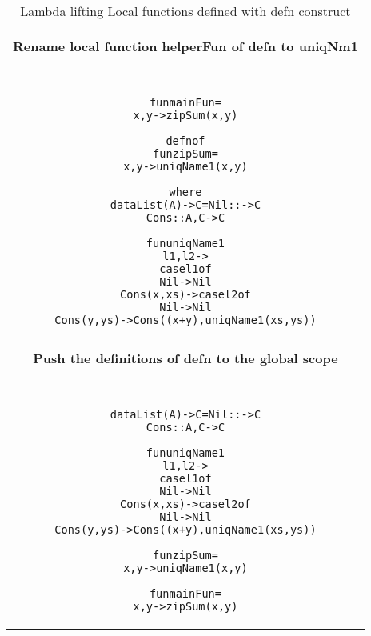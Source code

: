 \documentclass[11pt]{article}
\begin{document}
\begin{table}
\begin{center}
\begin{tabular}{|c|}\hline\\ 
{\bf Rename local function helperFun of {\sf defn} to uniqNm1}\\~~\\  
\hline
\begin{minipage}{5.5in}
\begin{alltt}


  fun mainFun = 
      x,y -> zipSum(x,y)
  
  defn of
    fun zipSum =
      x,y -> uniqName1(x,y)

  where 
        data List(A) -> C = Nil  ::     -> C
                            Cons :: A,C -> C 

        fun uniqName1 
          l1,l2 ->
            case l1 of 
              Nil -> Nil
              Cons(x,xs) -> case l2 of
                              Nil -> Nil
                              Cons(y,ys) -> Cons((x+y),uniqName1(xs,ys))


\end{alltt} 
\end {minipage} \\ 
\hline \\
{\bf Push the definitions of {\sf defn} to the global scope}\\~~\\  
\hline
\begin{minipage}{5in}
\begin{alltt}


  data List(A) -> C = Nil  ::     -> C
                      Cons :: A,C -> C 

  fun uniqName1 
    l1,l2 ->
      case l1 of 
        Nil -> Nil
        Cons(x,xs) -> case l2 of
                        Nil -> Nil
                        Cons(y,ys) -> Cons((x+y),uniqName1(xs,ys))

  fun zipSum =
      x,y -> uniqName1(x,y)

  fun mainFun = 
      x,y -> zipSum(x,y)




\end{alltt} 
\end {minipage} 
\tabularnewline
\hline
\end{tabular}
\caption{Lambda lifting Local functions defined with {\sf defn} construct}
\label{lam:LamLiftDefn}
\end{center}
\end{table}
\end{document}
